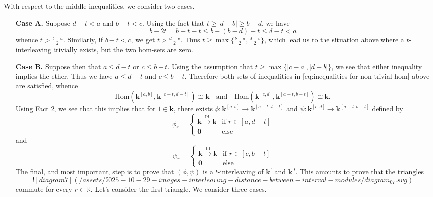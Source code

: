 \documentclass[11pt]{article}
\begin{document}
With respect to the middle inequalities,  
we consider two cases.
\begin{enumerate}[label=(\roman*),left=1cm]
\item[\textbf{Case A.}] 
Suppose \(d-t < a\) and \(b-t<c\).
Using the fact that  \(t\geq |d-b|\geq b-d\), we have
$$
b-2t = b -t -t \leq b-(b-d)-t \leq d-t < a
$$
whence $t > \frac{b-a}{2}$.
Similarly, if \(b-t < c\), we get \(t> \frac{d-c}{2}\).
Thus \(t\geq \max\{\frac{b-a}{2},\frac{d-c}{2}\}\),
which lead us to the situation above where 
a \(t\)-interleaving trivially exists,
but the two hom-sets are zero.

\item[\textbf{Case B.}]
Suppose then that \(a\leq d-t\) or \(c\leq b-t\).
Using the assumption that \(t\geq\max\{|c-a|,|d-b|\}\),
we see that either inequality implies the other.
Thus we have  \(a\leq d-t\) and \(c\leq b-t\).
Therefore both sets of inequalities in \eqref{eq:inequalities-for-non-trivial-hom} above are satisfied,
whence
$$
\mathrm{Hom}(\mathbf{k}^{[a,b]}, \mathbf{k}^{[c-t,d-t]})\cong \mathbf{k} 
\quad\text{and}\quad 
\mathrm{Hom}(\mathbf{k}^{[c,d]}, \mathbf{k}^{[a-t,b-t]})\cong \mathbf{k}.
$$
Using Fact 2, 
we see that
this implies that 
for \(1\in \mathbf{k}\), 
there exists 
\(\phi\colon \mathbf{k}^{[a,b]}\to \mathbf{k}^{[c-t,d-t]}\)
and 
\(\psi\colon \mathbf{k}^{[c,d]}\to \mathbf{k}^{[a-t,b-t]}\) defined by 
$$
\phi_r = %
\begin{cases}
\mathbf{k}\xrightarrow{\mathrm{Id}}\mathbf{k}
&\text{if } r\in [a,d-t]\\
\mathbf{0}&\text{else}
\end{cases}
$$
and 
$$
\psi_r = %
\begin{cases}
\mathbf{k}\xrightarrow{\mathrm{Id}}\mathbf{k}
&\text{if } r\in [c,b-t]\\
\mathbf{0}&\text{else}
\end{cases}
$$
The final, and most important, step is to prove 
that \((\phi,\psi)\) is a \(t\)-interleaving of \(\mathbf{k}^I \) and $\mathbf{k}^J $.
This amounts to prove that the 
triangles 
$$
![diagram 7](/assets/2025-10-29-images-interleaving-distance-between-interval-modules/diagram_07.svg)
$$
commute for every \(r\in \mathbb{R}\).
Let's consider the first triangle.
We consider three cases.
\begin{figure}[H]

\end{figure}
\end{enumerate}
\end{document}
